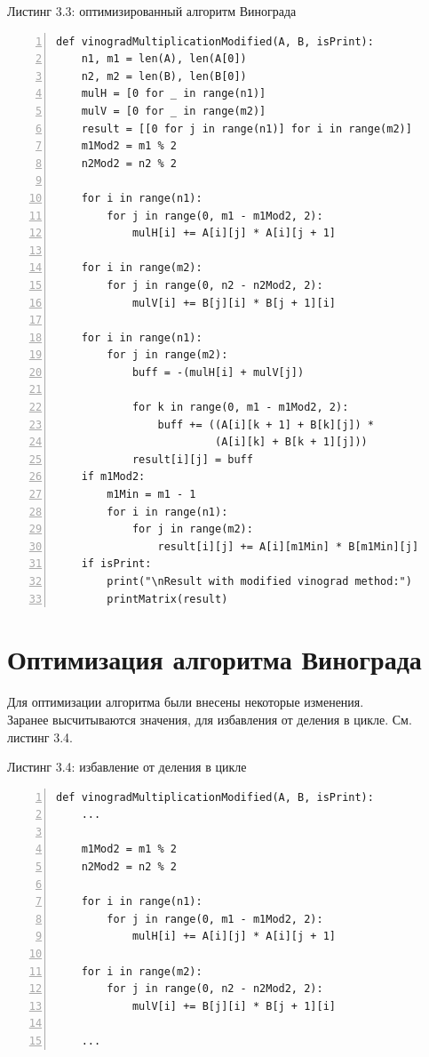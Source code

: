 \documentclass[12pt,a4paper]{report}
\begin{document}
\textrm{Листинг 3.3: оптимизированный алгоритм Винограда}
\begin{lstlisting}[frame=single, numbers=left]
def vinogradMultiplicationModified(A, B, isPrint):
    n1, m1 = len(A), len(A[0])
    n2, m2 = len(B), len(B[0])
    mulH = [0 for _ in range(n1)]
    mulV = [0 for _ in range(m2)]
    result = [[0 for j in range(n1)] for i in range(m2)]
    m1Mod2 = m1 % 2
    n2Mod2 = n2 % 2

    for i in range(n1):
        for j in range(0, m1 - m1Mod2, 2):
            mulH[i] += A[i][j] * A[i][j + 1]
    
    for i in range(m2):
        for j in range(0, n2 - n2Mod2, 2):
            mulV[i] += B[j][i] * B[j + 1][i]
    
    for i in range(n1):
        for j in range(m2):
            buff = -(mulH[i] + mulV[j])

            for k in range(0, m1 - m1Mod2, 2):
                buff += ((A[i][k + 1] + B[k][j]) * 
                         (A[i][k] + B[k + 1][j]))
            result[i][j] = buff
    if m1Mod2:
        m1Min = m1 - 1
        for i in range(n1):
            for j in range(m2):
                result[i][j] += A[i][m1Min] * B[m1Min][j]
    if isPrint:
        print("\nResult with modified vinograd method:")
        printMatrix(result)
\end{lstlisting}

\section{Оптимизация алгоритма Винограда}

Для оптимизации алгоритма были внесены некоторые изменения. \\

Заранее высчитываются значения, для избавления от деления в цикле. См. листинг 3.4.

\textrm{Листинг 3.4: избавление от деления в цикле}
\begin{lstlisting}[frame=single, numbers=left]
def vinogradMultiplicationModified(A, B, isPrint):
    ...

    m1Mod2 = m1 % 2
    n2Mod2 = n2 % 2

    for i in range(n1):
        for j in range(0, m1 - m1Mod2, 2):
            mulH[i] += A[i][j] * A[i][j + 1]
    
    for i in range(m2):
        for j in range(0, n2 - n2Mod2, 2):
            mulV[i] += B[j][i] * B[j + 1][i]
    
    ...
\end{lstlisting}
\end{document}
